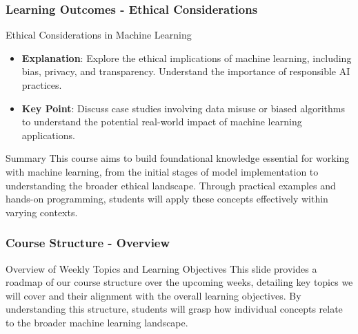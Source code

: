 \documentclass[aspectratio=169]{beamer}
\begin{document}
\begin{frame}[fragile]
    \frametitle{Learning Outcomes - Ethical Considerations}
    \begin{block}{Ethical Considerations in Machine Learning}
        \begin{itemize}
            \item \textbf{Explanation}: Explore the ethical implications of machine learning, including bias, privacy, and transparency. Understand the importance of responsible AI practices.
            \item \textbf{Key Point}: Discuss case studies involving data misuse or biased algorithms to understand the potential real-world impact of machine learning applications.
        \end{itemize}
    \end{block}
    
    \begin{block}{Summary}
        This course aims to build foundational knowledge essential for working with machine learning, from the initial stages of model implementation to understanding the broader ethical landscape. Through practical examples and hands-on programming, students will apply these concepts effectively within varying contexts.
    \end{block}
\end{frame}

\begin{frame}[fragile]
  \frametitle{Course Structure - Overview}
  \begin{block}{Overview of Weekly Topics and Learning Objectives}
    This slide provides a roadmap of our course structure over the upcoming weeks, detailing key topics we will cover and their alignment with the overall learning objectives. 
    By understanding this structure, students will grasp how individual concepts relate to the broader machine learning landscape.
  \end{block}
\end{frame}
\end{document}
